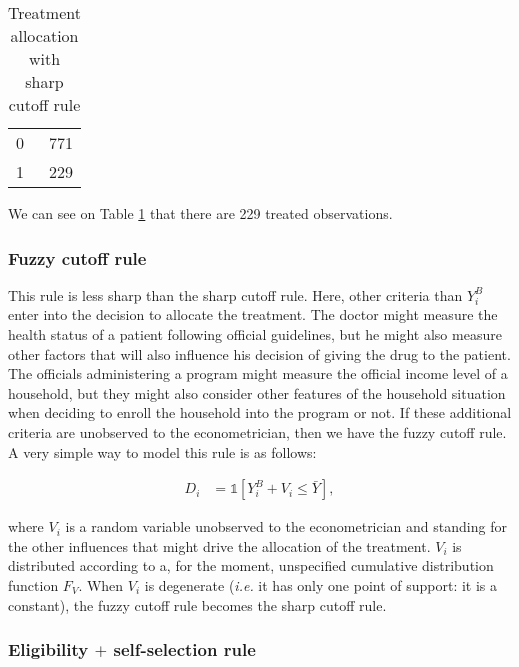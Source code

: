 \documentclass[
]{book}
\newcommand{\uns}[1]{\mathds{1}[ #1 ]}
\theoremstyle{definition}
\theoremstyle{definition}
\theoremstyle{definition}
\theoremstyle{definition}
\theoremstyle{remark}
\begin{document}
\begin{table}

\caption{\label{tab:tableDsharp}Treatment allocation with sharp cutoff rule}
\centering
\begin{tabular}[t]{lr}
\toprule
0 & 771\\
1 & 229\\
\bottomrule
\end{tabular}
\end{table}

We can see on Table \ref{tab:tableDsharp} that there are 229 treated observations.

\hypertarget{fuzzy-cutoff-rule}{%
\subsubsection{Fuzzy cutoff rule}\label{fuzzy-cutoff-rule}}

This rule is less sharp than the sharp cutoff rule.
Here, other criteria than \(Y_i^B\) enter into the decision to allocate the treatment.
The doctor might measure the health status of a patient following official guidelines, but he might also measure other factors that will also influence his decision of giving the drug to the patient.
The officials administering a program might measure the official income level of a household, but they might also consider other features of the household situation when deciding to enroll the household into the program or not.
If these additional criteria are unobserved to the econometrician, then we have the fuzzy cutoff rule.
A very simple way to model this rule is as follows:

\begin{align}\label{eq:fuzzcutoff}
  D_i & = \uns{Y_i^B+V_i\leq\bar{Y}},
\end{align}

where \(V_i\) is a random variable unobserved to the econometrician and standing for the other influences that might drive the allocation of the treatment.
\(V_i\) is distributed according to a, for the moment, unspecified cumulative distribution function \(F_V\).
When \(V_i\) is degenerate (\textit{i.e.} it has only one point of support: it is a constant), the fuzzy cutoff rule becomes the sharp cutoff rule.

\hypertarget{eligibility-self-selection-rule}{%
\subsubsection{\texorpdfstring{Eligibility \(+\) self-selection rule}{Eligibility + self-selection rule}}\label{eligibility-self-selection-rule}}
\end{document}
